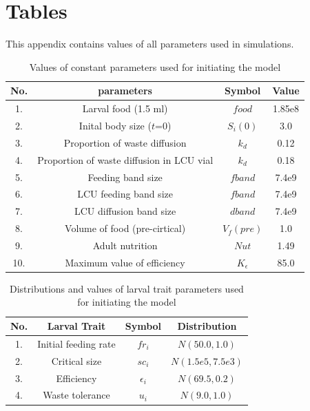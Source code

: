 \chapter{Tables}
This appendix contains values of all parameters used in simulations.

\begin{table}[h]
  \centering
  \begin{tabular}{|c|c|c|c|}
    \hline
    \textbf{No.} & \textbf{parameters} & \textbf{Symbol} & \textbf{Value} \\
    \hline
    1. & Larval food (1.5 ml) & $food$ & 1.85e8 \\
    \hline
    2. & Inital body size ($t$=0) & $S_{i}(0)$ & 3.0 \\
    \hline
    3. & Proportion of waste diffusion & $k_{d}$ & 0.12 \\
    \hline
    4. & Proportion of waste diffusion in LCU vial & $k_{d}$ & 0.18 \\
    \hline
    5. & Feeding band size & $fband$ & 7.4e9 \\
    \hline
    6. & LCU feeding band size & $fband$ & 7.4e9 \\
    \hline
    7. & LCU diffusion band size & $dband$ & 7.4e9 \\
    \hline
    8. & Volume of food (pre-cirtical) & $V_{f}(pre)$ & 1.0 \\
    \hline
    9. & Adult nutrition & $Nut$ & 1.49 \\
    \hline
    10. & Maximum value of efficiency & $K_{\epsilon}$ & 85.0 \\
    \hline
  \end{tabular}
  \caption{Values of constant parameters used for initiating the model}
  \label{tab:food_param}
\end{table}

\begin{table}[p]
  \centering
  \begin{tabular}{|c|c|c|c|}
    \hline
    \textbf{No.} & \textbf{Larval Trait} & \textbf{Symbol} & \textbf{Distribution} \\
    \hline
    1. & Initial feeding rate & $fr_{i}$ & $N(50.0,1.0)$ \\
    \hline
    2. & Critical size & $sc_{i}$ & $N(1.5e5,7.5e3)$ \\
    \hline
    3. & Efficiency & $\epsilon_{i}$ & $N(69.5,0.2)$ \\
    \hline
    4. & Waste tolerance & $u_{i}$ & $N(9.0,1.0)$ \\
    \hline
  \end{tabular}
  \caption{Distributions and values of larval trait parameters used for initiating the model}
  \label{tab:trait_value}
\end{table}

